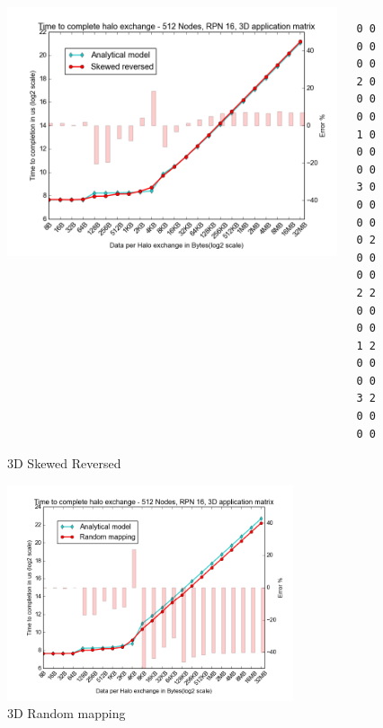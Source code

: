 \documentclass{beamer}
\begin{document}
\begin{frame}[fragile]
\begin{figure}
\caption{3D Skewed Reversed}
\begin{columns}
  \begin{column}{0.6\textwidth}
    \includegraphics[width=1\textwidth]{../mappings/3d_skewed_reversed.png}
  \end{column}
  \begin{column}{0.3\textwidth}
\lstset{title=Mapping sample}
\begin{lstlisting}[basicstyle=\footnotesize\ttfamily, frame=lines,columns=fixed]
0 0 0 0 0 0
2 0 0 0 0 0
1 0 0 0 0 0
3 0 0 0 0 0
0 2 0 0 0 0
2 2 0 0 0 0
1 2 0 0 0 0
3 2 0 0 0 0
\end{lstlisting}
  \end{column}
\end{columns}
\end{figure}
\end{frame}

\begin{frame}
\begin{figure}
\caption{3D Random mapping}
    \includegraphics[width=0.75\textwidth]{../mappings/3d_random.png}
\end{figure}
\end{frame}
\end{document}
